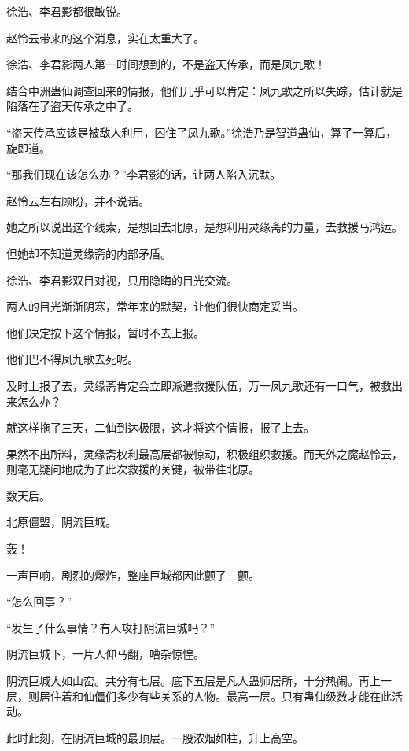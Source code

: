 
\begin{this_body}



徐浩、李君影都很敏锐。

赵怜云带来的这个消息，实在太重大了。

徐浩、李君影两人第一时间想到的，不是盗天传承，而是凤九歌！

结合中洲蛊仙调查回来的情报，他们几乎可以肯定：凤九歌之所以失踪，估计就是陷落在了盗天传承之中了。

“盗天传承应该是被敌人利用，困住了凤九歌。”徐浩乃是智道蛊仙，算了一算后，旋即道。

“那我们现在该怎么办？”李君影的话，让两人陷入沉默。

赵怜云左右顾盼，并不说话。

她之所以说出这个线索，是想回去北原，是想利用灵缘斋的力量，去救援马鸿运。

但她却不知道灵缘斋的内部矛盾。

徐浩、李君影双目对视，只用隐晦的目光交流。

两人的目光渐渐阴寒，常年来的默契，让他们很快商定妥当。

他们决定按下这个情报，暂时不去上报。

他们巴不得凤九歌去死呢。

及时上报了去，灵缘斋肯定会立即派遣救援队伍，万一凤九歌还有一口气，被救出来怎么办？

就这样拖了三天，二仙到达极限，这才将这个情报，报了上去。

果然不出所料，灵缘斋权利最高层都被惊动，积极组织救援。而天外之魔赵怜云，则毫无疑问地成为了此次救援的关键，被带往北原。

数天后。

北原僵盟，阴流巨城。

轰！

一声巨响，剧烈的爆炸，整座巨城都因此颤了三颤。

“怎么回事？”

“发生了什么事情？有人攻打阴流巨城吗？”

阴流巨城下，一片人仰马翻，嘈杂惊惶。

阴流巨城大如山峦。共分有七层。底下五层是凡人蛊师居所，十分热闹。再上一层，则居住着和仙僵们多少有些关系的人物。最高一层。只有蛊仙级数才能在此活动。

此时此刻，在阴流巨城的最顶层。一股浓烟如柱，升上高空。


\end{this_body}
